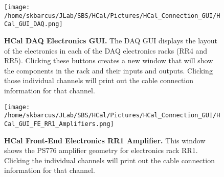\documentclass[oneside]{book}   %
\begin{document}
	\begin{figure}[!ht]
	\begin{center}
	\texttt{[image: /home/skbarcus/JLab/SBS/HCal/Pictures/HCal\_Connection\_GUI/HCal\_GUI\_DAQ.png]}
	\end{center}
	\caption{
	{\bf{HCal DAQ Electronics GUI.}} The DAQ GUI displays the layout of the electronics in each of the DAQ electronics racks (RR4 and RR5). Clicking these buttons creates a new window that will show the components in the rack and their inputs and outputs. Clicking those individual channels will print out the cable connection information for that channel.}
	\label{fig:hcal_gui_daq}
	\end{figure}	
	
	\begin{figure}[!ht]
	\begin{center}
	\texttt{[image: /home/skbarcus/JLab/SBS/HCal/Pictures/HCal\_Connection\_GUI/HCal\_GUI\_FE\_RR1\_Amplifiers.png]}
	\end{center}
	\caption{
	{\bf{HCal Front-End Electronics RR1 Amplifier.}} This window shows the PS776 amplifier geometry for electronics rack RR1. Clicking the individual channels will print out the cable connection information for that channel.}
	\label{fig:hcal_fe_amplifier}
	\end{figure}	



\end{document}

